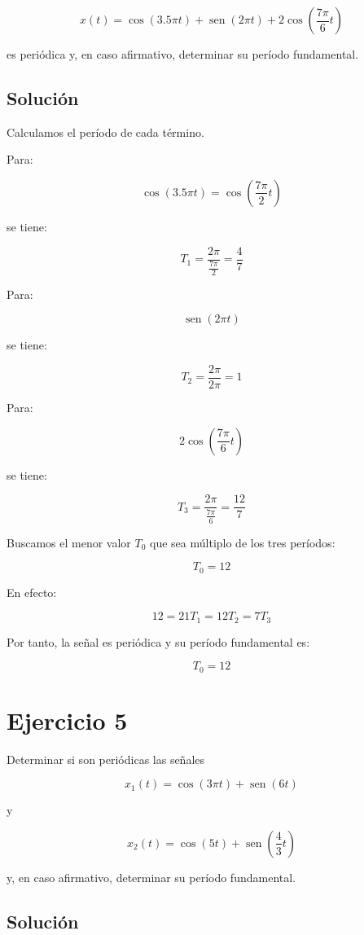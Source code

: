 \documentclass[fleqn]{article}
\DeclareMathOperator{\sen}{sen}
\begin{document}
	\[
	x(t)=\cos(3.5\pi t)+\sen(2\pi t)
	+2\cos\left(\frac{7\pi}{6}t\right)
	\]

	es periódica y, en caso afirmativo, determinar su período fundamental.

	\subsection{Solución}

	Calculamos el período de cada término.

	Para:

	\[
	\cos(3.5\pi t)
	=
	\cos\left(\frac{7\pi}{2}t\right)
	\]

	se tiene:

	\[
	T_1
	=
	\frac{2\pi}{\frac{7\pi}{2}}
	=
	\frac{4}{7}
	\]

	Para:

	\[
	\sen(2\pi t)
	\]

	se tiene:

	\[
	T_2
	=
	\frac{2\pi}{2\pi}
	=
	1
	\]

	Para:

	\[
	2\cos\left(\frac{7\pi}{6}t\right)
	\]

	se tiene:

	\[
	T_3
	=
	\frac{2\pi}{\frac{7\pi}{6}}
	=
	\frac{12}{7}
	\]

	Buscamos el menor valor $T_0$ que sea múltiplo de los tres períodos:

	\[
	T_0
	=
	12
	\]

	En efecto:

	\[
	12
	=
	21T_1
	=
	12T_2
	=
	7T_3
	\]

	Por tanto, la señal es periódica y su período fundamental es:

	\[
	\boxed{
	T_0=12
	}
	\]

\section{Ejercicio 5}
	Determinar si son periódicas las señales

	\[
	x_1(t)=\cos(3\pi t)+\sen(6t)
	\]

	y

	\[
	x_2(t)=\cos(5t)+\sen\left(\frac{4}{3}t\right)
	\]

	y, en caso afirmativo, determinar su período fundamental.

	\subsection{Solución}
\end{document}
